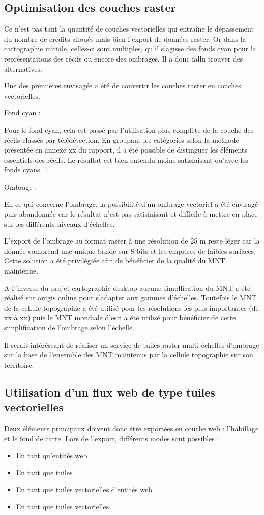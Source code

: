 \subsection{Optimisation des couches raster}
Ce n’est pas tant la quantité de couches vectorielles qui entraîne le dépassement du nombre de crédits alloués mais bien l’export de données raster. Or dans la cartographie initiale, celles-ci sont multiples, qu’il s’agisse des fonds cyan pour la représentations des récifs ou encore des ombrages. Il a donc fallu trouver des alternatives. 

Une des premières envisagée a été de convertir les couches raster en couches vectorielles. 

Fond cyan : 

Pour le fond cyan, cela est passé par l’utilisation plus complète de la couche des récifs classés par télédétection. En groupant les catégories selon la méthode présentée en annexe xx du rapport, il a été possible de distinguer les éléments essentiels des récifs. Le résultat est bien entendu moins satisfaisant qu’avec les fonds cyans. 1 

 

Ombrage : 

En ce qui concerne l’ombrage, la possibilité d’un ombrage vectoriel a été envisagé puis abandonnée car le résultat n’est pas satisfaisant et difficile à mettre en place sur les différents niveaux d’échelles.  

L’export de l’ombrage au format raster à une résolution de 25 m reste léger car la donnée comprend une unique bande sur 8 bits et les emprises de faibles surfaces. Cette solution a été privilégiée afin de bénéficier de la qualité du MNT maintenue. 

 

A l”inverse du projet cartographie desktop aucune simplfication du MNT a été réalisé sur arcgis online pour s’adapter aux gammes d’échelles. Toutefois le MNT de la cellule topographie a été utilisé pour les résolutions les plus importantes (de xx à xx) puis le MNT mondiale d’esri a été utilisé pour bénéficier de cette simplification de l’ombrage selon l’échelle. 

Il serait intéréssant de réaliser un service de tuiles raster multi échelles d’ombrage sur la base de l’ensemble des MNT maintenus par la cellule topographie sur son territoire. 

 
\subsection{Utilisation d'un flux web de type tuiles vectorielles}
Deux éléments principaux doivent donc être exportées en couche web : l’habillage et le fond de carte. Lors de l’export, différents modes sont possibles : 
\begin{itemize}
    \item En tant qu’entités web
    \item En tant que tuiles
    \item En tant que tuiles vectorielles d’entités web
    \item En tant que tuiles vectorielles 
\end{itemize}

